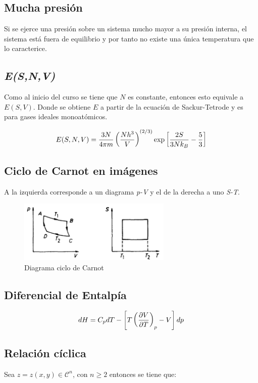 \subsection{Mucha presión}

Si se ejerce una presión sobre un sistema mucho mayor a su presión interna, el sistema está fuera de equilibrio y por tanto no existe una única temperatura que lo caracterice.

\subsection{\textit{E(S,N,V)}}
\label{eq:e(s,v,n)}
Como al inicio del curso se tiene que $N$ es constante, entonces esto equivale a $E(S,V)$. Donde se obtiene $E$ a partir de la ecuación de Sackur-Tetrode y es para gases ideales monoatómicos.

\[ E(S,N,V) = \frac{3N}{4 \pi m}\lados{(}{\frac{Nh^3}{V}}^{(2/3)}\exp\lados{[}{\frac{2S}{3Nk_B} - \frac{5}{3}} \]

\subsection{Ciclo de Carnot en imágenes}
A la izquierda corresponde a un diagrama \textit{p-V} y el de la derecha a uno \textit{S-T}.

\begin{figure}[H]
    \centering
    \includegraphics[width=0.65\textwidth]{img/ciclo_carnot.png}
    \caption{Diagrama ciclo de Carnot}
    \label{fig:diag_carnot}
\end{figure}

\subsection{Diferencial de Entalpía}

\[dH = C_pdT - \lados{[}{T\devtermo{p}{V}{T} - V}dp\]

\subsection{Relación cíclica}
\label{sub:relacion_ciclica}
Sea $z = z(x, y) \in \mathcal{C}^n$, con $n \geq 2$ entonces se tiene que:

